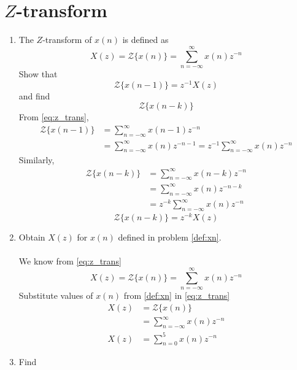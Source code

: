 \documentclass[journal,12pt,twocolumn]{IEEEtran}
\renewcommand\thesection{\arabic{section}}
\begin{document}
\section{$Z$-transform}
\begin{enumerate}[label=\thesection.\arabic*]
\item The $Z$-transform of $x(n)$ is defined as
%
\begin{equation}
\label{eq:z_trans}
X(z)={\mathcal {Z}}\{x(n)\}=\sum _{n=-\infty }^{\infty }x(n)z^{-n}
\end{equation}
%
Show that
\begin{equation}
\label{eq:shift1}
{\mathcal {Z}}\{x(n-1)\} = z^{-1}X(z)
\end{equation}
and find
\begin{equation}
	{\mathcal {Z}}\{x(n-k)\} 
\end{equation}
\solution From \eqref{eq:z_trans},
\begin{align}
{\mathcal {Z}}\{x(n-1)\} &=\sum _{n=-\infty }^{\infty }x(n-1)z^{-n}
\\
&=\sum _{n=-\infty }^{\infty }x(n)z^{-n-1} = z^{-1}\sum _{n=-\infty }^{\infty }x(n)z^{-n}
\end{align}
Similarly,
%
\begin{align}
{\mathcal {Z}}\{x(n-k)\} &=\sum _{n=-\infty }^{\infty }x(n-k)z^{-n}
\\
&=\sum _{n=-\infty }^{\infty }x(n)z^{-n-k} 
\\
&= z^{-k}\sum _{n=-\infty }^{\infty }x(n)z^{-n}
\end{align}
\begin{equation}
\label{eq:z_trans_shift}
	{\mathcal {Z}}\{x(n-k)\} = z^{-k}X(z)
\end{equation}
\item Obtain $X(z)$ for $x(n)$ defined in problem 
	\ref{def:xn}.
\\
\\
\solution
We know from \eqref{eq:z_trans}
\begin{equation}
\label{eq:e1}
X(z)={\mathcal {Z}}\{x(n)\}=\sum _{n=-\infty }^{\infty }x(n)z^{-n}
\end{equation}
Substitute values of $x(n)$ from \eqref{def:xn} in \eqref{eq:z_trans}
\begin{align}
    X(z)&={\mathcal {Z}}\{x(n)\}
    \\
    &=\sum _{n=-\infty }^{\infty }x(n)z^{-n}
    \\
    X(z)&=\sum _{n=0 }^{5 }x(n)z^{-n}
\end{align}
\item Find

\end{enumerate}
\end{document}
